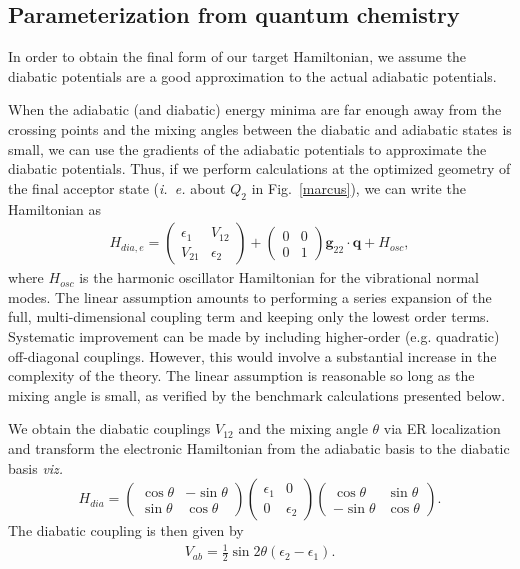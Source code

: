 \subsection{Parameterization from quantum chemistry}

 In order to obtain the final form of our target Hamiltonian, we assume the diabatic  potentials
are a good approximation to the actual adiabatic potentials.

When the adiabatic (and diabatic) energy minima
are far enough away from the crossing points and the mixing angles between the diabatic  and adiabatic
states is small, we can
use the gradients of the adiabatic potentials to approximate the diabatic potentials.
Thus, if we perform calculations at the
optimized geometry of the final acceptor state  ({\em i.~e.} about $Q_{2}$  in Fig.~\ref{marcus}),
we can write the Hamiltonian as
\begin{eqnarray}
H_{dia,e}=\left(\begin{array}{cc}
\epsilon_{1} & V_{12}\\
V_{21} & \epsilon_{2}
\end{array}\right)+\left(\begin{array}{cc}
0 & 0\\
0 & 1
\end{array}\right) {\mathbf g}_{22}\cdot{\mathbf q}+H_{osc},
\end{eqnarray}
where $H_{osc}$ is the harmonic oscillator Hamiltonian for the vibrational normal modes.
The linear assumption amounts  to performing a series expansion of the
full, multi-dimensional coupling term and keeping only the lowest order terms.
Systematic improvement can be made by including higher-order (e.g.  quadratic) off-diagonal couplings.
However, this would involve a substantial increase in the complexity of the theory.
The linear assumption is reasonable so long as  the mixing angle is small,
as verified by the benchmark calculations presented below.

We obtain the diabatic couplings $V_{12}$
and the mixing angle $\theta$  via ER localization and transform the electronic Hamiltonian
from the adiabatic basis to the diabatic basis {\em viz.}
\begin{equation}
H_{dia}=\left(\begin{array}{cc}
\cos\theta & -\sin\theta\\
\sin\theta & \cos\theta
\end{array}\right)\left(\begin{array}{cc}
\epsilon_{1}  & 0 \\
0  & \epsilon_{2}
\end{array}\right)\left(\begin{array}{cc}
\cos\theta & \sin\theta\\
-\sin\theta & \cos\theta
\end{array}\right).\label{eq:boys}
\end{equation}
The diabatic coupling is then given by
\begin{eqnarray}
V_{ab}=\frac{1}{2}\sin2\theta\left(\epsilon_{2}-\epsilon_{1}\right).
\end{eqnarray}


